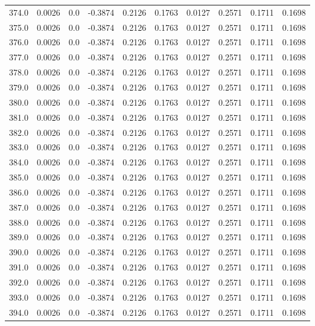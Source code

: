 \begin{longtable}{lrrrrrrrrr}
374.0 & 0.0026 & 0.0 & -0.3874 & 0.2126 & 0.1763 & 0.0127 & 0.2571 & 0.1711 & 0.1698 \\
375.0 & 0.0026 & 0.0 & -0.3874 & 0.2126 & 0.1763 & 0.0127 & 0.2571 & 0.1711 & 0.1698 \\
376.0 & 0.0026 & 0.0 & -0.3874 & 0.2126 & 0.1763 & 0.0127 & 0.2571 & 0.1711 & 0.1698 \\
377.0 & 0.0026 & 0.0 & -0.3874 & 0.2126 & 0.1763 & 0.0127 & 0.2571 & 0.1711 & 0.1698 \\
378.0 & 0.0026 & 0.0 & -0.3874 & 0.2126 & 0.1763 & 0.0127 & 0.2571 & 0.1711 & 0.1698 \\
379.0 & 0.0026 & 0.0 & -0.3874 & 0.2126 & 0.1763 & 0.0127 & 0.2571 & 0.1711 & 0.1698 \\
380.0 & 0.0026 & 0.0 & -0.3874 & 0.2126 & 0.1763 & 0.0127 & 0.2571 & 0.1711 & 0.1698 \\
381.0 & 0.0026 & 0.0 & -0.3874 & 0.2126 & 0.1763 & 0.0127 & 0.2571 & 0.1711 & 0.1698 \\
382.0 & 0.0026 & 0.0 & -0.3874 & 0.2126 & 0.1763 & 0.0127 & 0.2571 & 0.1711 & 0.1698 \\
383.0 & 0.0026 & 0.0 & -0.3874 & 0.2126 & 0.1763 & 0.0127 & 0.2571 & 0.1711 & 0.1698 \\
384.0 & 0.0026 & 0.0 & -0.3874 & 0.2126 & 0.1763 & 0.0127 & 0.2571 & 0.1711 & 0.1698 \\
385.0 & 0.0026 & 0.0 & -0.3874 & 0.2126 & 0.1763 & 0.0127 & 0.2571 & 0.1711 & 0.1698 \\
386.0 & 0.0026 & 0.0 & -0.3874 & 0.2126 & 0.1763 & 0.0127 & 0.2571 & 0.1711 & 0.1698 \\
387.0 & 0.0026 & 0.0 & -0.3874 & 0.2126 & 0.1763 & 0.0127 & 0.2571 & 0.1711 & 0.1698 \\
388.0 & 0.0026 & 0.0 & -0.3874 & 0.2126 & 0.1763 & 0.0127 & 0.2571 & 0.1711 & 0.1698 \\
389.0 & 0.0026 & 0.0 & -0.3874 & 0.2126 & 0.1763 & 0.0127 & 0.2571 & 0.1711 & 0.1698 \\
390.0 & 0.0026 & 0.0 & -0.3874 & 0.2126 & 0.1763 & 0.0127 & 0.2571 & 0.1711 & 0.1698 \\
391.0 & 0.0026 & 0.0 & -0.3874 & 0.2126 & 0.1763 & 0.0127 & 0.2571 & 0.1711 & 0.1698 \\
392.0 & 0.0026 & 0.0 & -0.3874 & 0.2126 & 0.1763 & 0.0127 & 0.2571 & 0.1711 & 0.1698 \\
393.0 & 0.0026 & 0.0 & -0.3874 & 0.2126 & 0.1763 & 0.0127 & 0.2571 & 0.1711 & 0.1698 \\
394.0 & 0.0026 & 0.0 & -0.3874 & 0.2126 & 0.1763 & 0.0127 & 0.2571 & 0.1711 & 0.1698 \\

\end{longtable}
